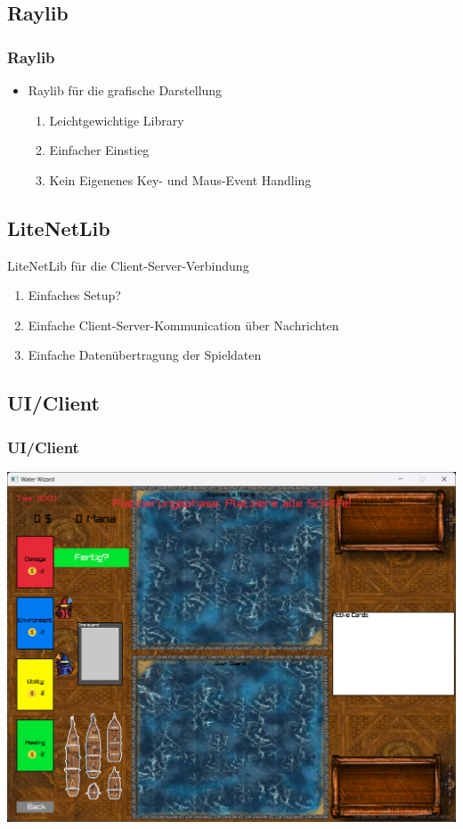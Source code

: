 \documentclass{beamer}
\begin{document}
\subsection{Raylib}
\begin{frame}
  \frametitle{Raylib}
  \begin{itemize}
    \item Raylib für die grafische Darstellung
    \begin{enumerate}
      \item Leichtgewichtige Library
      \item Einfacher Einstieg
      \item Kein Eigenenes Key- und Maus-Event Handling
    \end{enumerate}
  \end{itemize}
\end{frame}

\subsection{LiteNetLib}
\begin{frame}
  LiteNetLib für die Client-Server-Verbindung
    \begin{enumerate}
      \item Einfaches Setup?
      \item Einfache Client-Server-Kommunication über Nachrichten
      \item Einfache Datenübertragung der Spieldaten
    \end{enumerate}
\end{frame}

\subsection{UI/Client}
\begin{frame}
  \frametitle{UI/Client}
  \includegraphics[width=\textwidth]{GameScreen.png}
\end{frame}
\end{document}
